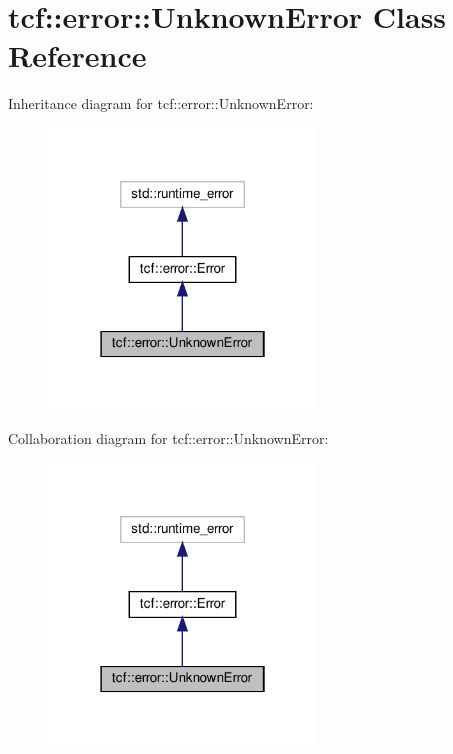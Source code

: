 \hypertarget{classtcf_1_1error_1_1UnknownError}{}\section{tcf\+:\+:error\+:\+:Unknown\+Error Class Reference}
\label{classtcf_1_1error_1_1UnknownError}


Inheritance diagram for tcf\+:\+:error\+:\+:Unknown\+Error\+:
\nopagebreak
\begin{figure}[H]
\begin{center}
\leavevmode
\includegraphics[width=202pt]{classtcf_1_1error_1_1UnknownError__inherit__graph}
\end{center}
\end{figure}


Collaboration diagram for tcf\+:\+:error\+:\+:Unknown\+Error\+:
\nopagebreak
\begin{figure}[H]
\begin{center}
\leavevmode
\includegraphics[width=202pt]{classtcf_1_1error_1_1UnknownError__coll__graph}
\end{center}
\end{figure}
